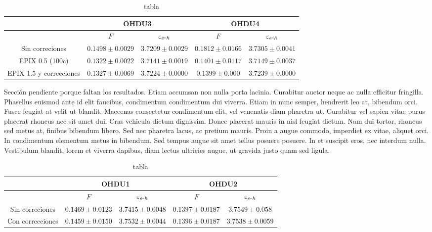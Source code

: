 \begin{table}[H]
\centering
\begin{tabular}{@{}ccccc@{}}
\toprule
                & \multicolumn{2}{c}{OHDU3}                 & \multicolumn{2}{c}{OHDU4}                 \\ \midrule
                & $F$                 & $\varepsilon_{e\mbox{-}h}$ & $F$                 & $\varepsilon_{e\mbox{-}h}$ \\
Sin correciones & $0.1498 \pm 0.0029$ & $3.7209 \pm 0.0029$ & $0.1812 \pm 0.0166$ & $3.7305 \pm 0.0041$ \\
EPIX 0.5 (100c) & $0.1322 \pm 0.0022$ & $3.7141 \pm 0.0019$ & $0.1401 \pm 0.0117$ & $3.7149 \pm 0.0037$ \\
EPIX 1.5 y correcciones    & $0.1327 \pm 0.0069$ & $3.7224 \pm 0.0000$ & $0.1399 \pm 0.000$ & $3.7239 \pm 0.0000$ \\ \bottomrule
\end{tabular}
\caption{tabla}
\label{tab:Correciones0.1}
\end{table}

Sección pendiente porque faltan los resultados. Etiam accumsan non nulla porta lacinia. Curabitur auctor neque ac nulla efficitur fringilla. Phasellus euismod ante id elit faucibus, condimentum condimentum dui viverra. Etiam in nunc semper, hendrerit leo at, bibendum orci. Fusce feugiat at velit ut blandit. Maecenas consectetur condimentum elit, vel venenatis diam pharetra ut. Curabitur vel sapien vitae purus placerat rhoncus nec sit amet dui. Cras vehicula dictum dignissim. Donec placerat mauris in nisl feugiat dictum. Nam dui tortor, rhoncus sed metus at, finibus bibendum libero. Sed nec pharetra lacus, ac pretium mauris. Proin a augue commodo, imperdiet ex vitae, aliquet orci. In condimentum elementum metus in bibendum. Sed tempus augue sit amet tellus posuere posuere. In et suscipit eros, nec interdum nulla. Vestibulum blandit, lorem et viverra dapibus, diam lectus ultricies augue, ut gravida justo quam sed ligula.

\begin{table}[]
\begin{tabular}{@{}ccccc@{}}
\toprule
                & \multicolumn{2}{c}{OHDU1}                 & \multicolumn{2}{c}{OHDU2}                 \\ \hline \hline
                & $F$                 & $\varepsilon_{e\mbox{-}h}$ & $F$                 & $\varepsilon_{e\mbox{-}h}$ \\ \hline
Sin correciones & $0.1469 \pm 0.0123$ & $3.7415 \pm 0.0048$ & $0.1397 \pm 0.0187$ & $3.7549 \pm 0.058$  \\
Con correcciones &
  \multicolumn{1}{c}{$0.1459 \pm 0.0150$} &
  \multicolumn{1}{c}{$3.7532 \pm 0.0044$} &
  \multicolumn{1}{c}{$0.1396 \pm 0.0187$} &
  \multicolumn{1}{c}{$3.7538 \pm 0.0059$} \\ \bottomrule
\end{tabular}
\caption{tabla}
\label{tab:OHDU1OHDU2}
\end{table}

